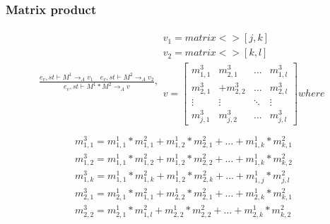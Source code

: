 \subsubsection{Matrix product}
\begin{minipage}{1.0\textwidth}
\begin{equation}
\begin{aligned}
	\frac { { e }_{ v },st\vdash { M }^{ 1 }{ \rightarrow  }_{ A }{ v }_{ 1 }\quad { e }_{ v },st\vdash { M }^{ 2 }{ \rightarrow  }_{ A }{ v }_{ 2 } }{ { e }_{ v },st\vdash { M }^{ 1 }*{ M }^{ 2 }{ \rightarrow  }_{ A }{ v } } ,\begin{matrix} { v }_{ 1 }=matrix<>[j,k] \\ { v }_{ 2 }=matrix<>[k,l] \\
	 v=\begin{bmatrix} { { m }_{ 1,1 }^{ 3 } } & { { m }_{ 2,1 }^{ 3 } } & \dots  & { m }_{ 1,l }^{ 3 }\\
{ { m }_{ 2,1 }^{ 3 } } &   +{ { m }_{ 2,2 }^{ 3 } } & \dots & { { m }_{ 2,l }^{ 3 } }
\\ \vdots  & \vdots & \ddots  & \vdots  \\
 { m }_{ j,1 }^{ 3 }& { { m }_{ j,2 }^{ 3 } } & \dots & { m }_{ j,l }^{ 3 } \end{bmatrix} where
\\ \end{matrix}
\end{aligned}
\end{equation}
\begin{equation*}
\begin{aligned}
{ { m }_{ 1,1 }^{ 3 } }  = { { m }_{ 1,1 }^{ 1 } } *{ { m }_{ 1,1 }^{ 2 } }+ { { m }_{ 1,2 }^{ 1 } } *{ { m }_{ 2,1 }^{ 2 } }+\dots+ { { m }_{ 1,k }^{ 1 } } *{ { m }_{ k,1 }^{ 2 } }\\
{ { m }_{ 1,2 }^{ 3 } }  = { { m }_{ 1,1 }^{ 1 } } *{ { m }_{ 1,2 }^{ 2 } }+ { { m }_{ 1,2 }^{ 1 } } *{ { m }_{ 2,2 }^{ 2 } }+\dots+ { { m }_{ 1,k }^{ 1 } } *{ { m }_{ k,2 }^{ 2 } }\\
{ { m }_{ 1,k }^{ 3 } }  = { { m }_{ 1,1 }^{ 1 } } *{ { m }_{ 1,k }^{ 2 } }+ { { m }_{ 1,2 }^{ 1 } } *{ { m }_{ 2,k }^{ 2 } }+\dots+ { { m }_{ 1,j }^{ 1 } } *{ { m }_{ j,l }^{ 2 } }\\
{ { m }_{ 2,1 }^{ 3 } }  = { { m }_{ 2,1 }^{ 1 } } *{ { m }_{ 1,1 }^{ 2 } }+ { { m }_{ 2,2 }^{ 1 } } *{ { m }_{ 2,1 }^{ 2 } }+\dots+ { { m }_{ 2,k }^{ 1 } } *{ { m }_{ k,1 }^{ 2 } }\\
{ { m }_{ 2,2 }^{ 3 } }  = { { m }_{ 2,1 }^{ 1 } } *{ { m }_{ 1,l }^{ 2 } }+ { { m }_{ 2,2 }^{ 1 } } *{ { m }_{ 2,2 }^{ 2 } }+\dots+ { { m }_{ 2,k }^{ 1 } } *{ { m }_{ k,2 }^{ 2 } }\\

\end{aligned}
\end{equation*}
\end{minipage}
